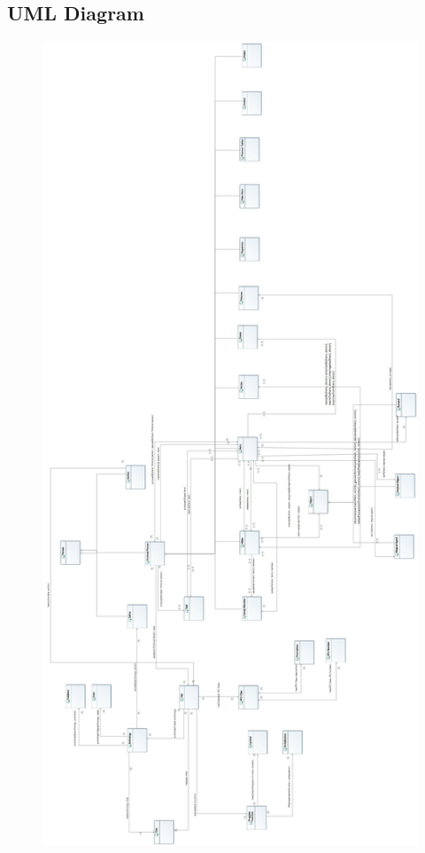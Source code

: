 \documentclass[10pt,a4paper]{article}
\begin{document}
\subsection{UML Diagram}
\begin{figure} [H]
\centering
	\includegraphics[scale=0.275]{NewModelClassDiagram.jpg}
\end{figure}
\end{document}
